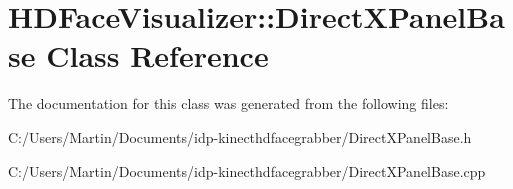 \hypertarget{class_h_d_face_visualizer_1_1_direct_x_panel_base}{}\section{H\+D\+Face\+Visualizer\+:\+:Direct\+X\+Panel\+Base Class Reference}
\label{class_h_d_face_visualizer_1_1_direct_x_panel_base}


The documentation for this class was generated from the following files\+:\begin{DoxyCompactItemize}
\item 
C\+:/\+Users/\+Martin/\+Documents/idp-\/kinecthdfacegrabber/Direct\+X\+Panel\+Base.\+h\item 
C\+:/\+Users/\+Martin/\+Documents/idp-\/kinecthdfacegrabber/Direct\+X\+Panel\+Base.\+cpp\end{DoxyCompactItemize}
